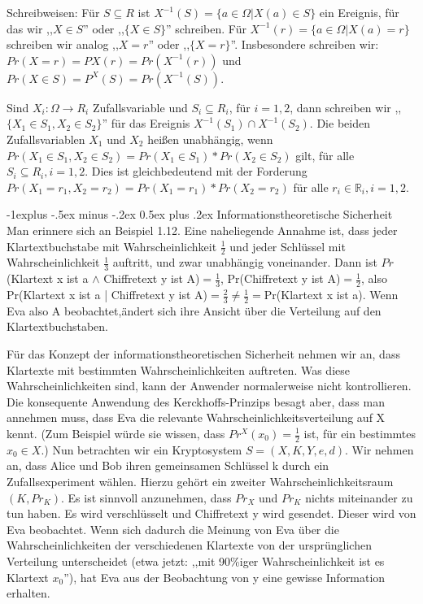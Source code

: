 \documentclass[a4paper]{article}
\makeatletter
\renewcommand{\subsection}{\@startsection{subsection}{2}{0mm}%
 {-1explus -.5ex minus -.2ex}%
 {0.5ex plus .2ex}%
 {\normalfont\normalsize\bfseries}}
\makeatother
\begin{document}
\begin{multicols}{3}
    Schreibweisen: Für $S\subseteq R$ ist $X^{-1}(S)=\{a\in\Omega|X(a)\in S\}$ ein Ereignis, für das wir ,,$X\in S$'' oder ,,$\{X\in S\}$'' schreiben. Für $X^{-1}(r)=\{a\in\Omega|X(a) =r\}$ schreiben wir analog ,,$X=r$'' oder ,,$\{X=r\}$''. Insbesondere schreiben wir: $Pr(X=r)=PX(r)=Pr(X^{-1}(r))$ und $Pr(X\in S)=P^X(S)=Pr(X^{-1}(S))$.

    Sind $X_i:\Omega\rightarrow R_i$ Zufallsvariable und $S_i\subseteq R_i$, für $i=1,2$, dann schreiben wir ,,$\{X_1\in S_1,X_2\in S_2\}$'' für das Ereignis $X^{-1}(S_1)\cap X^{-1}(S_2)$. Die beiden Zufallsvariablen $X_1$ und $X_2$ heißen unabhängig, wenn $Pr(X_1\in S_1,X_2\in S_2)=Pr(X_1\in S_1)*Pr(X_2\in S_2)$ gilt, für alle $S_i\subseteq R_i,i=1,2$. Dies ist gleichbedeutend mit der Forderung $Pr(X_1=r_1,X_2=r_2)=Pr(X_1=r_1)*Pr(X_2=r_2)$ für alle $r_i\in\mathbb{R}_i, i=1,2$.


    \subsection{Informationstheoretische Sicherheit}
    Man erinnere sich an Beispiel 1.12. Eine naheliegende Annahme ist, dass jeder Klartextbuchstabe mit Wahrscheinlichkeit $\frac{1}{2}$ und jeder Schlüssel mit Wahrscheinlichkeit $\frac{1}{3}$ auftritt, und zwar unabhängig voneinander. Dann ist $Pr$(Klartext x ist a $\wedge$ Chiffretext y ist A)$=\frac{1}{3}$, Pr(Chiffretext y ist A)$=\frac{1}{2}$, also Pr(Klartext x ist a | Chiffretext y ist A)$=\frac{2}{3}\not=\frac{1}{2}=$Pr(Klartext x ist a). Wenn Eva also A beobachtet,ändert sich ihre Ansicht über die Verteilung auf den Klartextbuchstaben.

    Für das Konzept der informationstheoretischen Sicherheit nehmen wir an, dass Klartexte mit bestimmten Wahrscheinlichkeiten auftreten. Was diese Wahrscheinlichkeiten sind, kann der Anwender normalerweise nicht kontrollieren. Die konsequente Anwendung des Kerckhoffs-Prinzips besagt aber, dass man annehmen muss, dass Eva die relevante Wahrscheinlichkeitsverteilung auf X kennt. (Zum Beispiel würde sie wissen, dass $Pr^X(x_0)=\frac{1}{2}$ ist, für ein bestimmtes $x_0\in X$.) Nun betrachten wir ein Kryptosystem $S=(X,K,Y,e,d)$. Wir nehmen an, dass Alice und Bob ihren gemeinsamen Schlüssel k durch ein Zufallsexperiment wählen. Hierzu gehört ein zweiter Wahrscheinlichkeitsraum $(K,Pr_K)$. Es ist sinnvoll anzunehmen, dass $Pr_X$ und $Pr_K$ nichts miteinander zu tun haben. Es wird verschlüsselt und Chiffretext y wird gesendet. Dieser wird von Eva beobachtet. Wenn sich dadurch die Meinung von Eva über die Wahrscheinlichkeiten der verschiedenen Klartexte von der ursprünglichen Verteilung unterscheidet (etwa jetzt: ,,mit 90\%iger Wahrscheinlichkeit ist es Klartext $x_0$''), hat Eva aus der Beobachtung von y eine gewisse Information erhalten.


\end{multicols}
\end{document}
